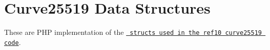 \chapter{Curve25519 Data Structures}
\hypertarget{md_public_2glpi_2vendor_2paragonie_2sodium__compat_2src_2_core_2_curve25519_2_r_e_a_d_m_e}{}\label{md_public_2glpi_2vendor_2paragonie_2sodium__compat_2src_2_core_2_curve25519_2_r_e_a_d_m_e}
\label{md_public_2glpi_2vendor_2paragonie_2sodium__compat_2src_2_core_2_curve25519_2_r_e_a_d_m_e_autotoc_md6890}%
%
 These are PHP implementation of the \href{https://github.com/jedisct1/libsodium/blob/master/src/libsodium/include/sodium/private/curve25519_ref10.h}{\texttt{ structs used in the ref10 curve25519 code}}. 